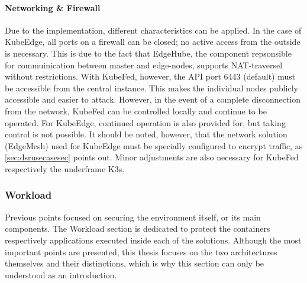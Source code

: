 \documentclass[MSC,Master,english]{twbook}%
\begin{document}
\paragraph{Networking \& Firewall} Due to the implementation, different characteristics can be applied. In the case of KubeEdge, all ports on a firewall can be closed; no active access from the outside is necessary. This is due to the fact that EdgeHube, the component repsonsible for commuinication between master and edge-nodes,  supports \ac{NAT}-traversel without restrictions.
With KubeFed, however, the API port 6443 (default) must be accessible from the central instance. This makes the individual nodes publicly accessible and easier to attack. However, in the event of a complete disconnection from the network, KubeFed can be controlled locally and continue to be operated. For KubeEdge, continued operation is also provided for, but taking control is not possible. It should be noted, however, that the network solution (EdgeMesh) used for KubeEdge must be specially configured to encrypt traffic, as \autoref{sec:dsrusecasesec} points out. Minor adjustments are also necessary for KubeFed respectively the underframe K3s.

\subsubsection{Workload} Previous points focused on securing the environment itself, or its main components. The Workload section is dedicated to protect the containers respectively applications executed inside each of the solutions. Although the most important points are presented, this thesis focuses on the two architectures themselves and their distinctions, which is why this section can only be understood as an introduction.
\end{document}

